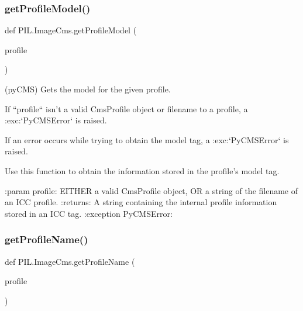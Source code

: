 \subsubsection{\texorpdfstring{get\+Profile\+Model()}{getProfileModel()}}
{\footnotesize\ttfamily def P\+I\+L.\+Image\+Cms.\+get\+Profile\+Model (\begin{DoxyParamCaption}\item[{}]{profile }\end{DoxyParamCaption})}

\begin{DoxyVerb}(pyCMS) Gets the model for the given profile.

If ``profile`` isn't a valid CmsProfile object or filename to a profile, a
:exc:`PyCMSError` is raised.

If an error occurs while trying to obtain the model tag,
a :exc:`PyCMSError` is raised.

Use this function to obtain the information stored in the profile's
model tag.

:param profile: EITHER a valid CmsProfile object, OR a string of the
    filename of an ICC profile.
:returns: A string containing the internal profile information stored in
    an ICC tag.
:exception PyCMSError:
\end{DoxyVerb}
 \mbox{\label{namespacePIL_1_1ImageCms_ae96275c1b44c0ed1055b96559e62b1c1}} 
\subsubsection{\texorpdfstring{get\+Profile\+Name()}{getProfileName()}}
{\footnotesize\ttfamily def P\+I\+L.\+Image\+Cms.\+get\+Profile\+Name (\begin{DoxyParamCaption}\item[{}]{profile }\end{DoxyParamCaption})}

